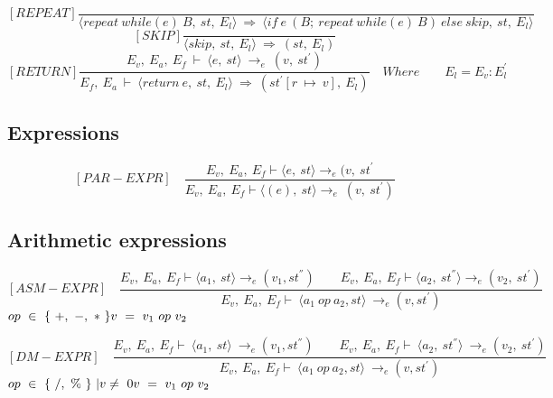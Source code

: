 	\[
	[REPEAT]
	\dfrac{}{\langle repeat \ while(e) \ B, \ st, \ E_l \rangle \ \Rightarrow \ \langle if \ e \ (B; \ repeat \ while(e) \ B) \ else \ skip, \ st, \ E_l \rangle}
	\]\newline
	\[
	[SKIP]
	\dfrac{}{\langle skip, \ st, \ E_l \rangle \ \Rightarrow \ (st, \ E_l)}
	\]\newline
	\[
	[RETURN]	
	\dfrac{E_v, \ E_a, \ E_f \ \vdash \ \langle e, \ st \rangle \ \rightarrow_e \ (v, \ st^{'})}{E_f, \ E_a \ \vdash \ \langle return \ e, \ st, \ E_l \rangle \ \Rightarrow \ (st^{'}[r \ \mapsto \ v], \ E_l)}
	\quad Where	
	\qquad E_l = E_v : E_l^{'}	
	\]\newline

	
\subsection{Expressions}
	\[	
	[PAR-EXPR] \quad	
	\dfrac{E_v, \ E_a, \ E_f \vdash \langle e, \ st \rangle \rightarrow_e (v, \ st^{'}}{E_v, \ E_a, \ E_f \vdash \langle (e), \ st \rangle \rightarrow_e \ (v, \ st^{'})}	
	\]

\subsection{Arithmetic expressions}
	\[
	[ASM-EXPR] \quad	
	\dfrac{E_v, \ E_a, \ E_f \vdash \langle a_1, \ st \rangle \rightarrow_{e} (v_1, st^{''}) \qquad E_v, \ E_a, \ E_f \vdash \langle a_2, \ st^{''}\rangle \rightarrow_e (v_2, \ st^{'})}{E_v, \ E_a, \ E_f \vdash \ \langle a_1 \ op \ a_2, st \rangle \ \rightarrow_{e} (v, st^{'})}	
	\]
	\begin{math}		
		op \ \in \ \{ \ +, \ -, \ * \ \} \newline		
		v \ = \ v_1 \ op \ v_2		
	\end{math}

	\[
	[DM-EXPR] \quad
	\dfrac{E_v, \ E_a, \ E_f \vdash \ \langle a_1, \ st \rangle \ \rightarrow_{e} (v_1, st^{''}) \qquad E_v, \ E_a, \ E_f \vdash \ \langle a_2, \ st^{''} \rangle \ \rightarrow_e (v_2, \ st^{'})}{E_v, \ E_a, \ E_f \vdash \ \langle a_1 \ op \ a_2, st \rangle \ \rightarrow_{e} (v, st^{'})}	
	\]
	\begin{math}		
		op \ \in \ \{ \ /, \ \% \ \} \ | v \not= \ 0 \newline 		
		v \ = \ v_1 \ op \ v_2		
	\end{math} 
	

